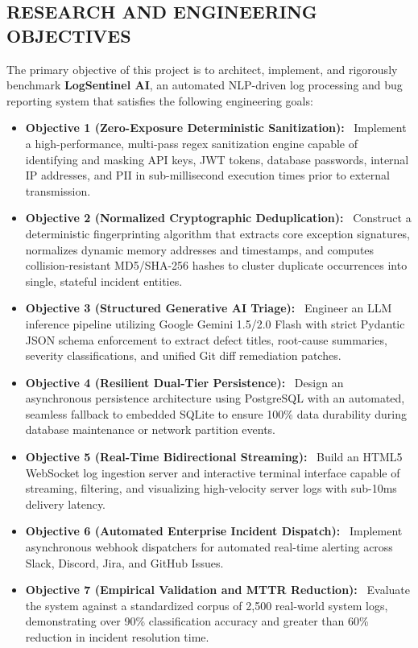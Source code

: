 \documentclass[12pt,a4paper]{article}
\newcommand{\lead}[1]{\textbf{#1}\ }
\begin{document}
\subsection{RESEARCH AND ENGINEERING OBJECTIVES}
The primary objective of this project is to architect, implement, and rigorously benchmark \textbf{LogSentinel AI}, an automated NLP-driven log processing and bug reporting system that satisfies the following engineering goals:
\begin{itemize}[leftmargin=1.2em,itemsep=4pt]
    \item \lead{Objective 1 (Zero-Exposure Deterministic Sanitization):} Implement a high-performance, multi-pass regex sanitization engine capable of identifying and masking API keys, JWT tokens, database passwords, internal IP addresses, and PII in sub-millisecond execution times prior to external transmission.
    \item \lead{Objective 2 (Normalized Cryptographic Deduplication):} Construct a deterministic fingerprinting algorithm that extracts core exception signatures, normalizes dynamic memory addresses and timestamps, and computes collision-resistant MD5/SHA-256 hashes to cluster duplicate occurrences into single, stateful incident entities.
    \item \lead{Objective 3 (Structured Generative AI Triage):} Engineer an LLM inference pipeline utilizing Google Gemini 1.5/2.0 Flash with strict Pydantic JSON schema enforcement to extract defect titles, root-cause summaries, severity classifications, and unified Git diff remediation patches.
    \item \lead{Objective 4 (Resilient Dual-Tier Persistence):} Design an asynchronous persistence architecture using PostgreSQL with an automated, seamless fallback to embedded SQLite to ensure 100\% data durability during database maintenance or network partition events.
    \item \lead{Objective 5 (Real-Time Bidirectional Streaming):} Build an HTML5 WebSocket log ingestion server and interactive terminal interface capable of streaming, filtering, and visualizing high-velocity server logs with sub-10ms delivery latency.
    \item \lead{Objective 6 (Automated Enterprise Incident Dispatch):} Implement asynchronous webhook dispatchers for automated real-time alerting across Slack, Discord, Jira, and GitHub Issues.
    \item \lead{Objective 7 (Empirical Validation and MTTR Reduction):} Evaluate the system against a standardized corpus of 2,500 real-world system logs, demonstrating over 90\% classification accuracy and greater than 60\% reduction in incident resolution time.
\end{itemize}
\end{document}
